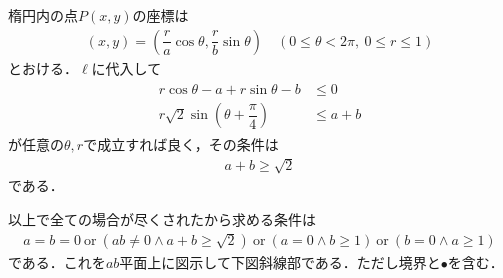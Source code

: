 \documentclass[../../main.tex]{subfiles}
\begin{document}
楕円内の点$P(x,y)$の座標は
\begin{align}
  (x,y)=\left(\dfrac{r}{a}\cos\theta,\dfrac{r}{b}\sin\theta\right) \quad (0\le\theta<2\pi,\ 0\le r\le1)
\end{align}
とおける．$\ell$に代入して
\begin{align}
  \begin{split}
    r\cos\theta-a+r\sin\theta-b&\le0 \\
    r\sqrt{2}\sin\left(\theta+\dfrac{\pi}{4}\right)&\le a+b
  \end{split}
\end{align}
が任意の$\theta,r$で成立すれば良く，その条件は
\begin{align}
  a+b\ge\sqrt{2}
\end{align}
である．
\casesend

以上で全ての場合が尽くされたから求める条件は
\begin{align}
  a=b=0 \ \text{or}\ (ab\ne0\wedge a+b\ge\sqrt{2})\ \text{or}\ (a=0\wedge b\ge1)\ \text{or}\ (b=0\wedge a\ge1)
\end{align}
である．これを$ab$平面上に図示して下図斜線部である．ただし境界と$\bullet$を含む．
\end{document}
